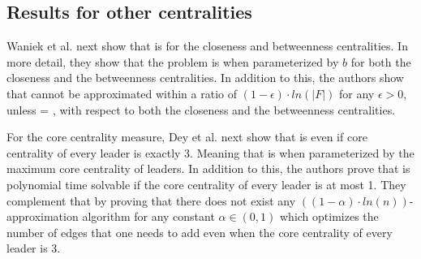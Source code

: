 \subsection{Results for other centralities}

Waniek et al. next show that \HL is \NPc for the closeness \cite{Waniek2017} and betweenness \cite{Waniek2021} centralities.
In more detail, they show that the problem is \Wh when parameterized by $b$ for both the closeness and the betweenness centralities.
In addition to this, the authors show that \HL cannot be approximated within a ratio of $(1 - \epsilon ) \cdot ln(|F|)$
for any $\epsilon > 0$, unless \Po = \NP, with respect to both the closeness and the betweenness centralities. 

For the core centrality measure, Dey et al. \cite{Dey2019} next show that \HLshort is \NPc even if core centrality of
every leader is exactly 3. Meaning that \HLshort is \pNPh when parameterized by the maximum core centrality of leaders.
In addition to this, the authors prove that \HLshort is polynomial time solvable
if the core centrality of every leader is at most 1.
They complement that by proving that there does not exist any $((1 - \alpha) \cdot ln(n))$-approximation algorithm
for any constant $\alpha \in (0, 1)$ which optimizes the number of edges that one needs to add even
when the core centrality of every leader is 3.
 